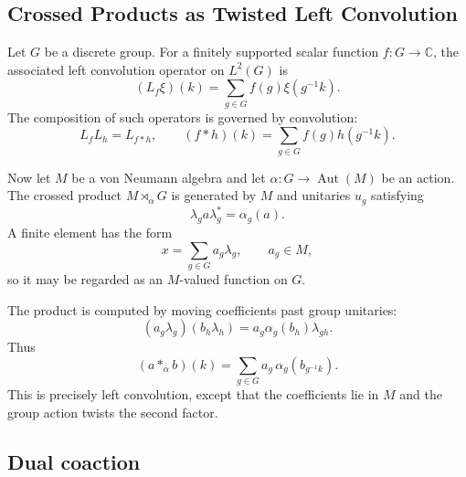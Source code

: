 \documentclass[11pt]{article}
\begin{document}
\subsection{Crossed Products as Twisted Left Convolution}

Let \(G\) be a discrete group. For a finitely supported scalar function
\(f:G\to \mathbb C\), the associated left convolution operator on
\(L^2(G)\) is
\[
  (L_f\xi)(k)
  =
  \sum_{g\in G} f(g)\xi(g^{-1}k).
\]
The composition of such operators is governed by convolution:
\[
  L_fL_h=L_{f*h},
  \qquad
  (f*h)(k)
  =
  \sum_{g\in G} f(g)h(g^{-1}k).
\]

Now let \(M\) be a von Neumann algebra and let
\(\alpha:G\to \operatorname{Aut}(M)\) be an action. The crossed product
\(M\rtimes_\alpha G\) is generated by \(M\) and unitaries \(u_g\) satisfying
\[
  \lambda_g a \lambda_g^*=\alpha_g(a).
\]
A finite element has the form
\[
  x=\sum_{g\in G} a_g \lambda_g,
  \qquad a_g\in M,
\]
so it may be regarded as an \(M\)-valued function on \(G\).

The product is computed by moving coefficients past group unitaries:
\[
  (a_g \lambda_g)(b_h \lambda_h)
  =
  a_g\alpha_g(b_h)\lambda_{gh}.
\]
Thus
\[
  (a *_\alpha b)(k)
  =
  \sum_{g\in G} a_g\,\alpha_g\!\left(b_{g^{-1}k}\right).
\]
This is precisely left convolution, except that the coefficients lie in
\(M\) and the group action twists the second factor.

\subsection{Dual coaction}
\end{document}
